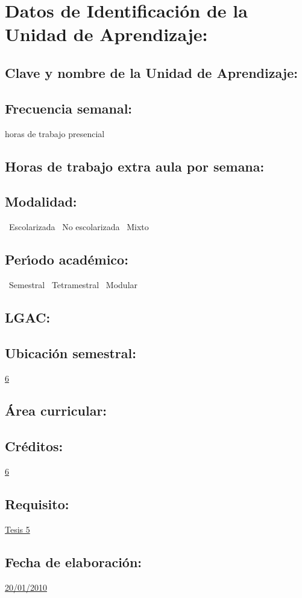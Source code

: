 \documentclass[10 pt]{article}
\begin{document}


\section{Datos de Identificaci\'{o}n de la Unidad de Aprendizaje:}
\subsection{Clave y nombre de la Unidad de Aprendizaje:} 
\subsection{Frecuencia semanal:} horas de trabajo presencial 
\subsection{Horas de trabajo extra aula por semana:} 
\subsection{Modalidad:} \yes~Escolarizada \no~No escolarizada \no~Mixto
\subsection{Per\'{\i}odo acad\'{e}mico:} \yes~Semestral
\no~Tetramestral \no~Modular
\subsection{LGAC:} \underline{\odsi}
\subsection{Ubicaci\'{o}n semestral:} \underline{6}
\subsection{\'{A}rea curricular:} \underline{\pi}
\subsection{Cr\'{e}ditos:} \underline{6}
\subsection{Requisito:} \underline{Tesis 5}
\subsection{Fecha de elaboraci\'{o}n:} \underline{20/01/2010}
\end{document}

